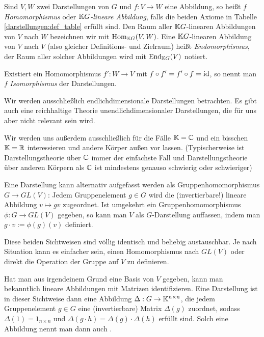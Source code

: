 \begin{definition}[Darstellungen]
Sind $V,W$ zwei Darstellungen von $G$ und $f: V\to W$ eine Abbildung, so heißt $f$ \emph{Homomorphismus} oder \emph{$\mathbb{K} G$-lineare Abbildung}, falls die beiden Axiome in Tabelle \ref{darstellungen:def_table} erfüllt sind. Den Raum aller $\mathbb{K} G$-linearen Abbildungen von $V$ nach $W$ bezeichnen wir mit $\operatorname{Hom}_{\mathbb{K} G}(V,W)$. Eine $\mathbb{K} G$-linearen Abbildung von $V$ nach $V$ (also gleicher Definitions- und Zielraum) heißt \emph{Endomorphismus}, der Raum aller solcher Abbildungen wird mit $\operatorname{End}_{\mathbb{K} G}(V)$ notiert.

Existiert ein Homomorphismus $f': W\to V$ mit $f\circ f'=f'\circ f=\operatorname{id}$, so nennt man $f$ \emph{Isomorphismus} der Darstellungen.
\end{definition}

\begin{convention}
Wir werden ausschließlich endlichdimensionale Darstellungen betrachten. Es gibt auch eine reichhaltige Theorie unendlichdimensionaler Darstellungen, die für uns aber nicht relevant sein wird.

Wir werden uns außerdem ausschließlich für die Fälle $\mathbb{K}=\mathbb{C}$ und ein bisschen $\mathbb{K}=\mathbb{R}$ interessieren und andere Körper außen vor lassen. (Typischerweise ist Darstellungstheorie über $\mathbb{C}$ immer der einfachste Fall und Darstellungstheorie über anderen Körpern als $\mathbb{C}$ ist mindestens genauso schwierig oder schwieriger)
\end{convention}

\begin{remark}
Eine Darstellung kann alternativ aufgefasst werden als Gruppenhomomorphismus $G\to GL(V)$: Jedem Gruppenelement $g\in G$ wird die (invertierbare!) lineare Abbildung $v\mapsto gv$ zugeordnet. Ist umgekehrt ein Gruppenhomomorphismus $\phi: G\to GL(V)$ gegeben, so kann man $V$ als $G$-Darstellung auffassen, indem man $g\cdot v:=\phi(g)(v)$ definiert.

Diese beiden Sichtweisen sind völlig identisch und beliebig austauschbar. Je nach Situation kann es einfacher sein, einen Homomorphismus nach $GL(V)$ oder direkt die Operation der Gruppe auf $V$ zu definieren.

Hat man aus irgendeinem Grund eine Basis von $V$ gegeben, kann man bekanntlich lineare Abbildungen mit Matrizen identifizieren. Eine Darstellung ist in dieser Sichtweise dann eine Abbildung $\Delta: G\to \mathbb{K}^{n\times n}$, die jedem Gruppenelement $g\in G$ eine (invertierbare) Matrix $\Delta(g)$ zuordnet, sodass $\Delta(1)=1_{n\times n}$ und $\Delta(g\cdot h)=\Delta(g)\cdot \Delta(h)$ erfüllt sind. Solch eine Abbildung nennt man dann auch .
\end{remark}

